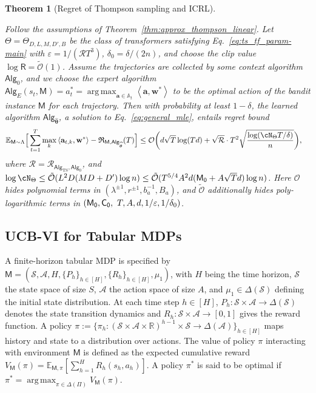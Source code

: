 \documentclass[10pt]{article}
\newtheorem{theorem}{Theorem}
\newcommand{\eps}{\varepsilon}
\DeclareMathOperator*{\argmax}{arg\,max}
\renewcommand{\cO}{\mathcal{O}}
\newcommand{\<}{\left\langle}
\renewcommand{\>}{\right\rangle}
\newcommand{\E}{\mathbb{E}}
\newcommand{\R}{\mathbb{R}}
\newcommand{\inst}{{\mathsf{M}}}
\newcommand{\TS}{{\mathrm{TS}}}
\newcommand{\Tpspar}{{\lambda}}
\newcommand{\Tpsparn}{{r}}
\newcommand{\tcO}{{\tilde{\mathcal O}}}
\newcommand{\state}{{s}}
\newcommand{\action}{{a}}
\newcommand{\totlen}{{T}}
\newcommand{\sAlg}{{\mathsf{Alg}}}
\newcommand{\Numobs}{{n}}
\newcommand{\Parspace}{{\Theta}}
\newcommand{\esttfpar}{{\widehat{\btheta}}}
\newcommand{\plc}{{\pi}}
\newcommand{\plcset}{{\Pi}}
\newcommand{\optplc}{{\pi^*}}
\newcommand{\prior}{{\Lambda}}
\newcommand{\horizon}{{H}}
\newcommand{\statesp}{{\mathcal{S}}}
\newcommand{\actionsp}{{\mathcal{A}}}
\renewcommand{\horizon}{{H}}
\newcommand{\transit}{{P}}
\newcommand{\rewardfun}{{R}}
\newcommand{\init}{{\mu_1}}
\newcommand{\valuefun}{{V}}
\newcommand{\shortexp}{{E}}
\newcommand{\layer}{{L}}
\newcommand{\hidden}{{D'}}
\newcommand{\head}{{M}}
\newcommand{\clipval}{{\mathsf{R}}}
\newcommand{\embd}{{D}}
\newcommand{\totreward}{{\mathfrak{R}}}
\newcommand{\distratio}{{\mathcal{R}}}
\newcommand{\Numst}{{S}}
\newcommand{\Numact}{{A}}
\newcommand{\neuron}{{\mathsf{M_0}}}
\newcommand{\weightn}{{{\mathsf{C_0}}}}
\def\sA{{\mathbb{A}}}
\def\btheta{{\boldsymbol \theta}}
\def\ba{{\mathbf a}}
\def\bw{{\mathbf w}}
\begin{document}
\begin{theorem}
[Regret of Thompson sampling and ICRL]\label{thm:ts_linear_regret}





Follow the assumptions of Theorem~\ref{thm:approx_thompson_linear}. Let $\Theta = \Theta_{D, L, M, \hidden, B}$ be the class of transformers satisfying Eq.~\eqref{eq:ts_tf_param-main} with $\eps=1/(\distratio\totlen^3)$,   $\delta_0=\delta/(2n)$, and choose the clip value $\log \clipval = \tcO(1)$. Assume the trajectories are collected by some context algorithm $\sAlg_0$, and we choose the expert algorithm $\sAlg_\shortexp(\state_t,\inst)=\action^*_t=\argmax_{\ba\in\sA_t}\<\ba,\bw^*\>$ to be the optimal action of the bandit instance $\inst$ for each trajectory. Then with probability at least $1-\delta$, the learned algorithm $\sAlg_{\esttfpar}$, a solution to Eq.~\eqref{eq:general_mle}, entails regret bound
\begin{align*}
\E_{\inst\sim\prior}\Big[\sum_{t=1}^\totlen\max_{k}\<\ba_{t,k},\bw^*\>-\totreward_{\inst,\sAlg_\esttfpar}(\totlen)\Big]&\leq \cO \bigg( d\sqrt{T}\log(Td)+ \sqrt{\distratio} \cdot\totlen^2\sqrt{\frac{\log ( \cN_{\Parspace} \totlen/\delta ) }{n} } \bigg),
\end{align*}
where $\distratio = \distratio_{\sAlg_\TS,\sAlg_0}$, and $\log \cN_{\Parspace} \le \tcO(\layer^2\embd(\head\embd+\hidden)\log \Numobs )  \leq\tcO(\totlen^{5/4}\Numact^2 d(\neuron+\Numact\sqrt{\totlen}d)\log\Numobs)$. Here $\cO$ hides polynomial terms in $(\Tpspar^{\pm1}, \Tpsparn^{\pm1}, b_a^{-1}, B_a)$, and $\tcO$ additionally hides poly-logarithmic terms in   $(\neuron,\weightn,\\~ \totlen, \Numact, d, 1/\eps, 1/\delta_0)$.
\end{theorem}





\subsection{UCB-VI for Tabular MDPs}\label{sec:Tabular-MDP-statement}


A finite-horizon tabular MDP is specified by $\inst=(\statesp,\actionsp, \horizon, \{\transit_h\}_{h\in[\horizon]},\{\rewardfun_h\}_{h\in[\horizon]},\init)$, with $\horizon$ being the time horizon, $\statesp$ the state space of size $\Numst$, $\actionsp$ the action space of size $\Numact$, and $\init\in\Delta(\statesp)$ defining the initial state distribution. At each time step $h\in[\horizon]$, $\transit_h: \statesp\times\actionsp \to \Delta(\statesp)$ denotes the state transition dynamics and $\rewardfun_h:\statesp \times \actionsp \to [0,1]$ gives the reward function. A policy $\plc:=\{\plc_h:(\statesp \times\actionsp \times \R)^{h-1}\times\statesp \to\Delta(\actionsp)\}_{h \in [\horizon]}$ maps history and state to a distribution over actions. The value of policy $\pi$ interacting with environment $\inst$ is defined as the expected cumulative reward $\valuefun_\inst(\plc)=\E_{\inst,\plc}[\sum_{h=1}^\horizon \rewardfun_h (\state_h,\action_h)]$. A policy $\optplc$ is said to be optimal if $\optplc=\argmax_{\pi\in\Delta(\plcset)}\valuefun_\inst(\pi)$.
\end{document}
